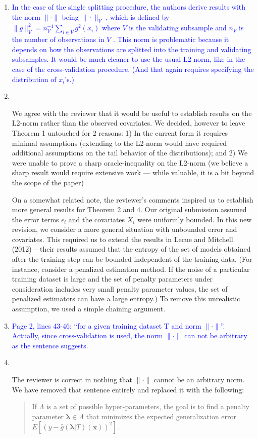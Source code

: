\documentclass[]{article}
\newcommand{\point}[1]{\item \textcolor{blue}{#1}}
\newcommand{\reply}{\item[]\ }
\begin{document}
\begin{enumerate}
	
		\point{
			In the case of the single splitting procedure, the authors derive results with the norm $\|\cdot\|$ being $\|\cdot\|_V$ , which is defined by $\|g \|_V^2 = n_V^{-1} \sum_{i\in V} g^2(x_i)$ where $V$ is the validating subsample and $n_V$ is the number of observations in $V$ . This norm is problematic because it depends on how the observations are splitted into the training and validating subsamples. It would be much cleaner to use the usual L2-norm, like in the case of the cross-validation procedure. (And that again requires specifying the distribution of $x_i$’s.)
		}
	
		\reply{
			We agree with the reviewer that it would be useful to establish results on the L2-norm rather than the observed covariates. 
			We decided, however to leave Theorem 1 untouched for 2 reasons: 1) In the current form it requires minimal assumptions 
			(extending to the L2-norm would have required additional assumptions on the tail behavior of the distributions); and 
			2) We were unable to prove a sharp oracle-inequality on the L2-norm
			(we believe a sharp result would require extensive work --- while valuable, it is a bit beyond the scope of the paper)

			On a somewhat related note, the reviewer's comments inspired us to establish more general results for Theorem 2 and 4.
			Our original submission assumed the error terms $\epsilon_i$ and the covariates $X_i$ were uniformly bounded.
			In this new revision, we consider a more general situation with unbounded error and covariates.
			This required us to extend the results in Lecue and Mitchell (2012) -- their results assumed that the entropy of the set of models obtained after the training step can be bounded independent of the training data.
			(For instance, consider a penalized estimation method. If the noise of a particular training dataset is large and the set of penalty parameters under consideration includes very small penalty parameter values, the set of penalized estimators can have a large entropy.)
			To remove this unrealistic assumption, we used a simple chaining argument.
		}

		\point{
			Page 2, lines 43-46: “for a given training dataset T and norm $\|\cdot \|$”. Actually, since cross-validation is used, the norm $\|\cdot \|$ can not be arbitrary as the sentence suggests.
		}

		\reply{
			The reviewer is correct in nothing that $\|\cdot\|$ cannot be an arbitrary norm.
			We have removed that sentence entirely and replaced it with the following:
			\begin{quote}
			If $\Lambda$ is a set of possible hyper-parameters, the goal is to find a penalty parameter $\boldsymbol{\lambda} \in \Lambda$ that minimizes the expected generalization error
			$
			E \left [
			\left ( y - \hat{g}(\boldsymbol{\lambda} | T)(\boldsymbol{x}) \right )^2
			\right ].
			$
		\end{quote}
		
}
\end{enumerate}
\end{document}
